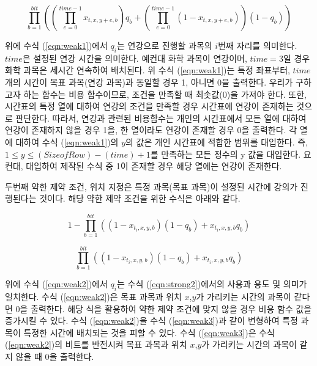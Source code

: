 \documentclass{article}
\begin{document}
    \begin{equation}\label{eqn:weak1}
        \prod_{b=1}^{bit} \left( \left( \prod_{e=0}^{time-1}x_{t,x,y+e,b} \right) q_{b}+\left ( \prod_{e=0}^{time-1} (1-x_{t,x,y+e,b}) \right) (1-q_{b}) \right ) 
    \end{equation}

위에 수식 (\ref{eqn:weak1})에서 $q_{i}$는 연강으로 진행할 과목의 $i$번째 자리를 의미한다. $time$은 설정된 연강 시간을 의미한다. 예컨대 화학 과목이 연강이며, $time=3$일 경우 화학 과목은 세시간 연속하여 배치된다. 위 수식 (\ref{eqn:weak1})는 특정 좌표부터, $time$개의 시간이 목표 과목(연강 과목)과 동일할 경우 1, 아니면 0을 출력한다. 우리가 구하고자 하는 함수는 비용 함수이므로, 조건을 만족할 때 최솟값(0)을 가져야 한다. 또한, 시간표의 특정 열에 대하여 연강의 조건을 만족할 경우 시간표에 연강이 존재하는 것으로 판단한다. 따라서, 연강과 관련된 비용함수는 개인의 시간표에서 모든 열에 대하여 연강이 존재하지 않을 경우 1을, 한 열이라도 연강이 존재할 경우 0을 출력한다. 각 열에 대하여 수식 (\ref{eqn:weak1})의 $y$의 값은 개인 시간표에 적합한 범위를 대입한다. 즉, $1 \leq y \leq (Size of Row)-(time)+1$를 만족하는 모든 정수의 y 값을 대입한다. 요컨대, 대입하여 제작된 수식 중 1이 존재할 경우 해당 열에는 연강이 존재한다.

    두번째 약한 제약 조건, 위치 지정은 특정 과목(목표 과목)이 설정된 시간에 강의가 진행된다는 것이다. 해당 약한 제약 조건을 위한 수식은 아래와 같다.

    \begin{equation}\label{eqn:weak2}
        1- \prod_{b=1}^{bit}\left ( (1-x_{t_{i},x,y,b} )(1-q_{b} )+x_{t_{i},x,y,b} q_{b} \right ) 
    \end{equation}

    \begin{equation}\label{eqn:weak3}
        \prod_{b=1}^{bit}\left ( (1-x_{t_{i},x,y,b} )(1-q_{b} )+x_{t_{i},x,y,b} q_{b} \right ) 
    \end{equation}

위에 수식 (\ref{eqn:weak2})에서 $q_{i}$는 수식 (\ref{eqn:strong2})에서의 사용과 용도 및 의미가 일치한다. 수식 (\ref{eqn:weak2})은 목표 과목과 위치 $x$,$y$가 가리키는 시간의 과목이 같다면 0을 출력한다. 해당 식을 활용하여 약한 제약 조건에 맞지 않을 경우 비용 함수 값을 증가시킬 수 있다. 수식 (\ref{eqn:weak2})을 수식 (\ref{eqn:weak3})과 같이 변형하여 특정 과목이 특정한 시간에 배치되는 것을 피할 수 있다. 수식 (\ref{eqn:weak3})은 수식 (\ref{eqn:weak2})의 비트를 반전시켜 목표 과목과 위치 $x$,$y$가 가리키는 시간의 과목이 같지 않을 때 0을 출력한다.
\end{document}

